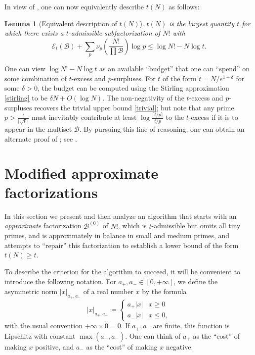 \documentclass[12pt,a4paper,reqno]{amsart}
\numberwithin{equation}{section}
\theoremstyle{plain}
\newtheorem{lemma}[theorem]{Lemma}
\theoremstyle{definition}
\newcommand\tuple{{\mathcal B}}
\newcommand\excess{{\mathcal{E}}}
\begin{document}
In view of , one can now equivalently describe 
$t(N)$ as follows:

\begin{lemma}[Equivalent description of $t(N)$]\label{t-descrip}  $t(N)$ is the largest quantity $t$ for which there exists a $t$-admissible subfactorization of $N!$ with
$$ \excess_t(\tuple) + \sum_p \nu_p\left( \frac{N!}{\prod \tuple} \right) \log p \leq \log N! - N \log t.$$
\end{lemma}

One can view $\log N! - N\log t$ as an available ``budget'' that one can ``spend'' on some combination of $t$-excess and $p$-surpluses.  For $t$ of the form $t = N/e^{1+\delta}$ for some $\delta>0$, the budget can be computed using the Stirling approximation \eqref{stirling} to be $\delta N + O(\log N)$.  The non-negativity of the $t$-excess and $p$-surpluses recovers the trivial upper bound \eqref{trivial}; but note that any prime $p > \frac{t}{\lfloor \sqrt{t} \rfloor}$ must inevitably contribute at least $\log \frac{\lceil t/p\rceil}{t/p}$ to the $t$-excess if it is to appear in the multiset $\tuple$.  By pursuing this line of reasoning, one can obtain an alternate proof of ; see \cite[Lemma 2.1]{tao}.

\section{Modified approximate factorizations}\label{approx-sec}

In this section we present and then analyze an algorithm that starts with an \emph{approximate} factorization $\tuple^{(0)}$ of $N!$, which is $t$-admissible but omits all tiny primes, and is approximately in balance in small and medium primes, and attempts to ``repair'' this factorization to establish a lower bound of the form $t(N) \geq t$.  

To describe the criterion for the algorithm to succeed, it will be convenient to introduce the following notation.
For $a_+,a_- \in [0,+\infty]$, we define the asymmetric norm $|x|_{a_+,a_-}$ of a real number $x$ by the formula
$$ 
|x|_{a_+,a_-} \coloneqq  \begin{cases} 
  a_+ |x| & x\geq 0 \\
  a_- |x| & x\leq 0,
\end{cases}
$$
with the usual convention $+\infty \times 0 = 0$.
If $a_+,a_-$ are finite, this function is Lipschitz with constant $\max(a_+,a_-)$.  One can think of $a_+$ as the ``cost'' of making $x$ positive, and $a_-$ as the
``cost'' of making $x$ negative. 
\end{document}
